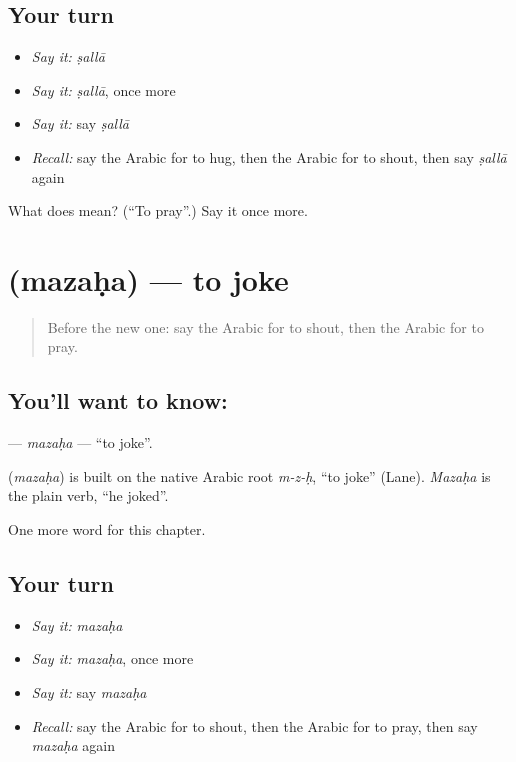 \subsection*{Your turn}
\begin{itemize}
\raggedright
  \item \emph{Say it:} \emph{ṣallā}
  \item \emph{Say it:} \emph{ṣallā}, once more
  \item \emph{Say it:} say \emph{ṣallā}
  \item \emph{Recall:} say the Arabic for to hug, then the Arabic for to shout, then say \emph{ṣallā} again
\end{itemize}

\begin{tcolorbox}[breakable,colback=teal!4,colframe=teal!35!black,title={Before you move on}]
What does  mean? (\textquotedblleft{}To pray\textquotedblright{}.) Say it once more.
\end{tcolorbox}
\section[\texorpdfstring{\ar{مزح} (mazaḥa)}{مزح (mazaḥa)}]{ (mazaḥa) — to joke}

\label{lesson:AR-C164-mazaha}



\begin{quote}
Before the new one: say the Arabic for to shout, then the Arabic for to pray.
\end{quote}

\subsection*{You'll want to know: }
\textbf{} — \emph{mazaḥa} — \textquotedblleft{}to joke\textquotedblright{}.

\begin{cousinweb}
\textbf{} (\emph{mazaḥa}) is built on the native Arabic root \emph{m-z-ḥ}, \textquotedblleft{}to joke\textquotedblright{} (Lane). \emph{Mazaḥa} is the plain verb, \textquotedblleft{}he joked\textquotedblright{}.
\end{cousinweb}

\begin{grammarlens}[title={What you've built}]
One more word for this chapter.
\end{grammarlens}

\subsection*{Your turn}
\begin{itemize}
\raggedright
  \item \emph{Say it:} \emph{mazaḥa}
  \item \emph{Say it:} \emph{mazaḥa}, once more
  \item \emph{Say it:} say \emph{mazaḥa}
  \item \emph{Recall:} say the Arabic for to shout, then the Arabic for to pray, then say \emph{mazaḥa} again
\end{itemize}

